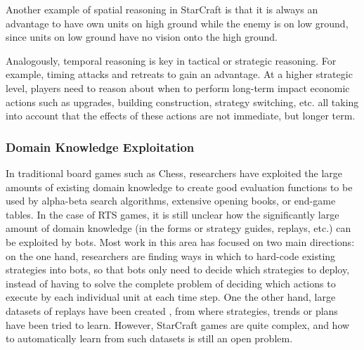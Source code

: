 \documentclass[journal]{IEEEtran}
\begin{document}
Another example of spatial reasoning in StarCraft is that it is always an advantage to have own units on high ground while the enemy is on low ground, since units on low ground have no vision onto the high ground. %

Analogously, temporal reasoning is key in tactical or strategic reasoning. For example, timing attacks and retreats to gain an advantage. At a higher strategic level, players need to reason about when to perform long-term impact economic actions such as upgrades, building construction, strategy switching, etc. all taking into account that the effects of these actions are not immediate, but longer term.


\subsubsection{Domain Knowledge Exploitation}
In traditional board games such as Chess, researchers have exploited the large amounts of existing domain knowledge to create good evaluation functions to be used by alpha-beta search algorithms, extensive opening books, or end-game tables. In the case of RTS games, it is still unclear how the significantly large amount of domain knowledge (in the forms or strategy guides, replays, etc.) can be exploited by bots. Most work in this area has focused on two main directions: on the one hand, researchers are finding ways in which to hard-code existing strategies into bots, so that bots only need to decide which strategies to deploy, instead of having to solve the complete problem of deciding which actions to execute by each individual unit at each time step. One the other hand, large datasets of replays have been created \cite{WeberCig09,synnaeve2012dataset}, from where strategies, trends or plans have been tried to learn. However, StarCraft games are quite complex, and how to automatically learn from such datasets is still an open problem.
\end{document}
